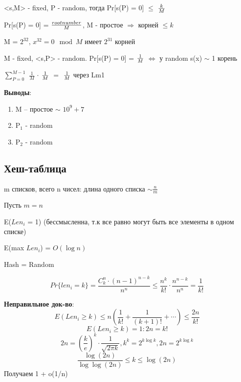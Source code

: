 \begin{lemma}{} 
<s,M> - fixed, P - random, тогда Pr[s(P) = 0] $\le$ ${k}\over{M}$ 

Pr[s(P) = 0] = ${ root number \over{M}}$, M - простое $\Rightarrow$ корней $\le k$
\end{lemma}

\begin{Rem}
 M = $2^{32}$, $x^{32} = 0 \mod M$ имеет $2^{31}$ корней 
\end{Rem}

\begin{lemma}{}
 M - fixed, <s,P> - random. Pr[s(P) = 0] = ${1}\over{M}$ $\Leftrightarrow$ у random s(x) $\sim$ 1 корень

$\sum_{P=0}^{M-1}$ $\frac{1}{M}$ $\cdot$ $1\over{M}$ $=$ $1\over{M}$ через Lm1
\end{lemma}

\textbf{Выводы}:
\begin{enumerate}
	\item M -- простое  $\sim$ $10^9+7$
	\item P$_1$ - random
	\item P$_2$ - random
\end{enumerate}   

\subsection{Хеш-таблица}
m списков, всего n чисел: длина одного списка $\sim \frac{n}{m}$

Пусть $m = n$

\begin{lemma}{}
E($Len_i$ = 1) (бессмысленна, т.к все равно могут быть все элементы в одном списке) 
\end{lemma}{}

\begin{lemma}{}
 E(max $Len_i$) = $O(\log n)$
\end{lemma}

Hash = Random

$$Pr\{len_i = k\} = \frac{C^n_k \cdot (n-1)^{n-k}}{n^n} \le \frac{n^k}{k!}\cdot\frac{n^{n-k}}{n^n} = \frac{1}{k!}$$

\textbf{Неправильное док-во}: 
$$E(Len_i \ge k) \le n(\frac{1}{k!}+\frac{1}{(k+1)!}+ \cdots) \le \frac{2n}{k!}$$
$$E(Len_i \ge k) = 1\colon 2n = k!$$
$$2n = (\frac{k}{e})^k \cdot \frac{1}{\sqrt{2 \pi k}}, k^k = 2^{k\log k}, 2n = 2^{k\log k}$$
$$\frac{\log(2n)}{\log\log(2n)} \le k \le \log(2n)$$
Получаем 1 + o(1/n)

